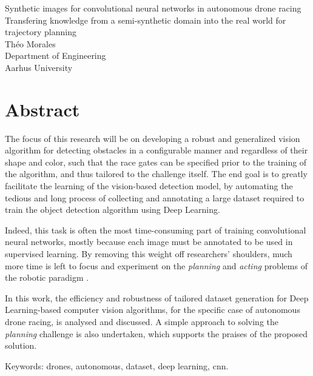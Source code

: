 Synthetic images for convolutional neural networks in autonomous
drone racing \\
Transfering knowledge from a semi-synthetic domain into the real world for
trajectory planning\\
Théo Morales\\
Department of Engineering\\
Aarhus University \setlength{\parskip}{0.5cm}

\thispagestyle{plain}			%
\setlength{\parskip}{0pt plus 1.0pt}
\section*{Abstract}
The focus of this research will be on developing a robust and generalized
vision algorithm for detecting obstacles in a configurable manner and regardless
of their shape and color, such that the race gates can be specified prior to the
training of the algorithm, and thus tailored to the challenge itself. The end
goal is to greatly facilitate the learning of the vision-based detection model,
by automating the tedious and long process of collecting and annotating a large
dataset required to train the object detection algorithm using Deep Learning.

Indeed, this task is often the most time-consuming part of training
convolutional neural networks, mostly because each image must be annotated to be
used in supervised learning. By removing this weight off researchers' shoulders,
much more time is left to focus and experiment on the \emph{planning} and
\emph{acting} problems of the robotic paradigm .

In this work, the efficiency and robustness of tailored dataset generation for
Deep Learning-based computer vision algorithms, for the specific case of
autonomous drone racing, is analysed and discussed.
A simple approach to solving the \emph{planning} challenge is also undertaken,
which supports the praises of the proposed solution.

\vfill
Keywords: drones, autonomous, dataset, deep learning, cnn.


